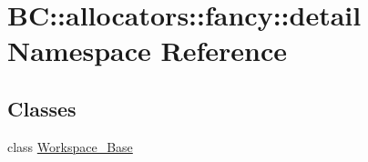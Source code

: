 \hypertarget{namespaceBC_1_1allocators_1_1fancy_1_1detail}{}\section{BC\+:\+:allocators\+:\+:fancy\+:\+:detail Namespace Reference}
\label{namespaceBC_1_1allocators_1_1fancy_1_1detail}
\subsection*{Classes}
\begin{DoxyCompactItemize}
\item 
class \hyperlink{classBC_1_1allocators_1_1fancy_1_1detail_1_1Workspace__Base}{Workspace\+\_\+\+Base}
\end{DoxyCompactItemize}
